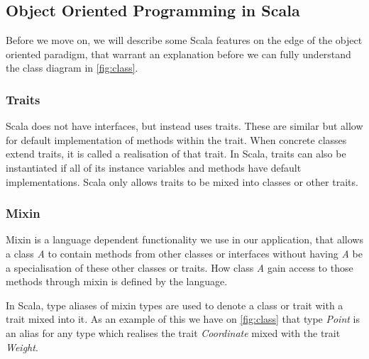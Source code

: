 \subsection{Object Oriented Programming in Scala}
Before we move on, we will describe some Scala features on the edge of the object oriented paradigm, that warrant an explanation before we can fully understand the class diagram in \cref{fig:class}.

\subsubsection{Traits}
Scala does not have interfaces, but instead uses traits. These are similar but allow for default implementation of methods within the trait. When concrete classes extend traits, it is called a realisation of that trait. In Scala, traits can also be instantiated if all of its instance variables and methods have default implementations. Scala only allows traits to be mixed into classes or other traits.

\subsubsection{Mixin}
Mixin is a language dependent functionality we use in our application, that allows a class \emph{A} to contain methods from other classes or interfaces without having \emph{A} be a specialisation of these other classes or traits. How class \emph{A} gain access to those methods through mixin is defined by the language. 

In Scala, type aliases of mixin types are used to denote a class or trait with a trait mixed into it. As an example of this we have on \cref{fig:class} that type \emph{Point} is an alias for any type which realises the trait \emph{Coordinate} mixed with the trait \emph{Weight}.
